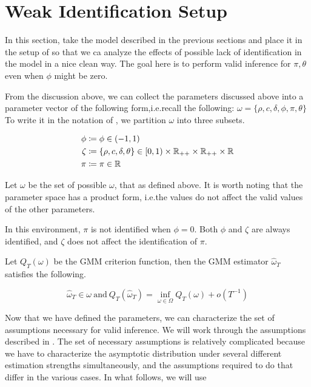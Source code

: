 \documentclass[11pt, letterpaper, twoside, final]{article}
\begin{document}
\section{Weak Identification Setup}

In this section, take the model described in the previous sections and place it in the setup of
\textcite{andrews2014Gmm} so that we ca analyze the effects of possible lack of identification in the model in a
nice clean way.
The goal here is to perform valid inference for $\pi, \theta$ even when $\phi$ might be zero. 


From the discussion above, we can collect the parameters discussed above into a parameter vector of the following
form,i.e.\@ recall the following: $\omega = \lbrace \rho, c, \delta, \phi, \pi, \theta \rbrace$
To write it in the notation of \textcite{andrews2014Gmm}, we partition $\omega$ into three subsets.

\begin{align}
    \phi &\coloneqq \phi  \in (-1, 1) \\ 
    \zeta &\coloneqq \lbrace \rho, c, \delta, \theta \rbrace \in [0,1) \times \mathbb{R}_{++} \times \mathbb{R}_{++} \times
    \mathbb{R}  \\
    \pi &\coloneqq \pi \in \mathbb{R}
\end{align}

Let $\omega$ be the set of possible $\omega$, that as defined above.
It is worth noting that the parameter space has a product form, i.e.\@ the values do not affect the valid values
of the other parameters.

In this environment, $\pi$ is not identified when $\phi = 0$.
Both $\phi$ and $\zeta$ are always identified, and $\zeta$ does not affect the identification of $\pi$.

Let $Q_T(\omega)$ be the GMM criterion function, then the GMM estimator $\hat{\omega}_T$ satisfies the following.


\begin{equation}
    \widehat{\omega}_T \in \omega\ \text{and}\ Q_T(\hat{\omega}_T) = \inf_{\omega \in \Omega} Q_T(\omega) +
    o\left(T^{-1}\right) 
\end{equation}


Now that we have defined the parameters, we can characterize the set of assumptions necessary for valid inference.
We will work through the assumptions described in \textcite{andrews2014Gmm}.
The set of necessary assumptions is relatively complicated because we have to characterize the asymptotic
distribution under several different estimation strengths simultaneously, and the assumptions required to do that
  differ in the various cases. 
In what follows, we will use 
\end{document}
